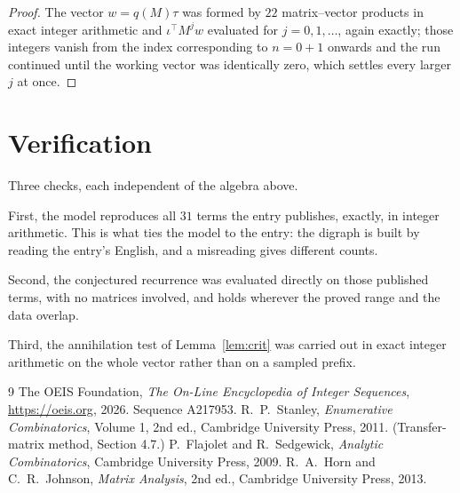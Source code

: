\documentclass[11pt,a4paper]{article}
\theoremstyle{plain}
\theoremstyle{definition}
\begin{document}
\begin{proof}
The vector $w=q(M)\tau$ was formed by $22$ matrix--vector products in exact integer
arithmetic and $\iota^{\!\top}M^{j}w$ evaluated for $j=0,1,\dots$, again exactly; those
integers vanish from the index corresponding to $n=0+1$ onwards and the run continued
until the working vector was identically zero, which settles every larger $j$ at once.
\end{proof}

\section{Verification}

Three checks, each independent of the algebra above.

First, the model reproduces all $31$ terms the entry publishes, exactly, in integer
arithmetic. This is what ties the model to the entry: the digraph is built by reading the
entry's English, and a misreading gives different counts.

Second, the conjectured recurrence was evaluated directly on those published terms, with no
matrices involved, and holds wherever the proved range and the data overlap.

Third, the annihilation test of Lemma~\ref{lem:crit} was carried out in exact integer
arithmetic on the whole vector rather than on a sampled prefix.

\begin{thebibliography}{9}
 The OEIS Foundation, \emph{The On-Line Encyclopedia of Integer
Sequences}, \url{https://oeis.org}, 2026. Sequence A217953.
 R.~P.~Stanley, \emph{Enumerative Combinatorics}, Volume 1, 2nd ed.,
Cambridge University Press, 2011. (Transfer-matrix method, Section 4.7.)
 P.~Flajolet and R.~Sedgewick, \emph{Analytic Combinatorics}, Cambridge
University Press, 2009.
 R.~A.~Horn and C.~R.~Johnson, \emph{Matrix Analysis}, 2nd ed., Cambridge
University Press, 2013.
\end{thebibliography}
\end{document}
